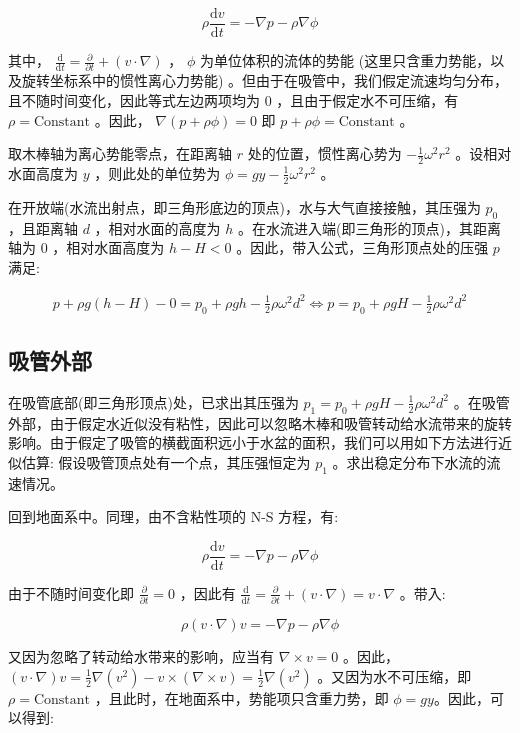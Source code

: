 \documentclass[fontset=windows]{article}
\begin{document}
$$
\rho\frac{\text{d}v}{\text{d}t} = - \nabla p - \rho \nabla \phi
$$

其中， $\frac{\text{d}}{\text{d}t} = \frac{\partial}{\partial t} + (v \cdot \nabla)$ ， $\phi$ 为单位体积的流体的势能 (这里只含重力势能，以及旋转坐标系中的惯性离心力势能) 。但由于在吸管中，我们假定流速均匀分布，且不随时间变化，因此等式左边两项均为 $0$ ，且由于假定水不可压缩，有 $\rho = \text{Constant}$ 。因此， $\nabla (p + \rho \phi) = 0$ 即 $p + \rho \phi = \text{Constant}$ 。

取木棒轴为离心势能零点，在距离轴 $r$ 处的位置，惯性离心势为 $-\frac{1}{2}\omega^2 r^2$ 。设相对水面高度为 $y$ ，则此处的单位势为 $\phi = gy - \frac{1}{2}\omega^2 r^2$ 。

在开放端(水流出射点，即三角形底边的顶点)，水与大气直接接触，其压强为 $p_0$ ，且距离轴 $d$ ，相对水面的高度为 $h$ 。在水流进入端(即三角形的顶点)，其距离轴为 $0$ ，相对水面高度为 $h - H < 0$ 。因此，带入公式，三角形顶点处的压强 $p$ 满足:

$$
\begin{aligned}
    p + \rho g (h - H) - 0 = p_0 + \rho g h - \frac{1}{2}\rho\omega^2 d^2
    \iff p = p_0 + \rho g H - \frac{1}{2}\rho\omega^2 d^2
\end{aligned}
$$

\subsection{吸管外部}

在吸管底部(即三角形顶点)处，已求出其压强为 $p_1 = p_0 + \rho g H - \frac{1}{2}\rho\omega^2 d^2$ 。在吸管外部，由于假定水近似没有粘性，因此可以忽略木棒和吸管转动给水流带来的旋转影响。由于假定了吸管的横截面积远小于水盆的面积，我们可以用如下方法进行近似估算: 假设吸管顶点处有一个点，其压强恒定为 $p_1$ 。求出稳定分布下水流的流速情况。

回到地面系中。同理，由不含粘性项的 $\text{N-S}$ 方程，有:

$$
\rho\frac{\text{d}v}{\text{d}t} = - \nabla p - \rho \nabla \phi
$$

由于不随时间变化即 $\frac{\partial}{\partial t} = 0$ ，因此有 $\frac{\text{d}}{\text{d}t} = \frac{\partial}{\partial t} + (v \cdot \nabla) = v \cdot \nabla$ 。带入:

$$
\rho (v \cdot \nabla) v = - \nabla p - \rho \nabla \phi
$$

又因为忽略了转动给水带来的影响，应当有 $\nabla \times v = 0$ 。因此，$(v \cdot \nabla) v = \frac{1}{2} \nabla (v^2) - v \times (\nabla \times v) = \frac{1}{2} \nabla (v^2)$ 。又因为水不可压缩，即 $\rho = \text {Constant}$ ，且此时，在地面系中，势能项只含重力势，即 $\phi = gy$。因此，可以得到:
\end{document}
